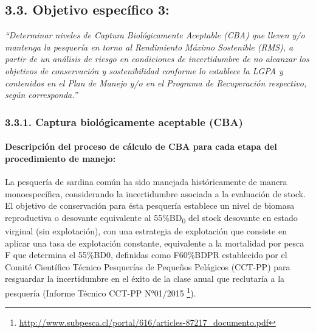 \documentclass[
  spanish,
]{article}
\begin{document}
\hypertarget{objetivo-especuxedfico-3}{%
\subsection{3.3. Objetivo específico
3:}\label{objetivo-especuxedfico-3}}

\vspace{-0.2cm}

\emph{``Determinar niveles de Captura Biológicamente Aceptable (CBA) que
lleven y/o mantenga la pesquería en torno al Rendimiento Máximo
Sostenible (RMS), a partir de un análisis de riesgo en condiciones de
incertidumbre de no alcanzar los objetivos de conservación y
sostenibilidad conforme lo establece la LGPA y contenidos en el Plan de
Manejo y/o en el Programa de Recuperación respectivo, según
corresponda.''}

\hypertarget{captura-bioluxf3gicamente-aceptable-cba-1}{%
\subsubsection{3.3.1. Captura biológicamente aceptable
(CBA)}\label{captura-bioluxf3gicamente-aceptable-cba-1}}

\hypertarget{descripciuxf3n-del-proceso-de-cuxe1lculo-de-cba-para-cada-etapa-del-procedimiento-de-manejo}{%
\paragraph{Descripción del proceso de cálculo de CBA para cada etapa del
procedimiento de
manejo:}\label{descripciuxf3n-del-proceso-de-cuxe1lculo-de-cba-para-cada-etapa-del-procedimiento-de-manejo}}

La pesquería de sardina común ha sido manejada históricamente de manera
monoespecífica, considerando la incertidumbre asociada a la evaluación
de stock. El objetivo de conservación para ésta pesquería establece un
nivel de biomasa reproductiva o desovante equivalente al
55\%BD\textsubscript{0} del stock desovante en estado virginal (sin
explotación), con una estrategia de explotación que consiste en aplicar
una tasa de explotación constante, equivalente a la mortalidad por pesca
F que determina el 55\%BD0, definidas como F60\%BDPR establecido por el
Comité Científico Técnico Pesquerías de Pequeños Pelágicos (CCT-PP) para
resguardar la incertidumbre en el éxito de la clase anual que reclutaría
a la pesquería (Informe Técnico CCT-PP N°01/2015 \footnote{\url{http://www.subpesca.cl/portal/616/articles-87217_documento.pdf}}).
\end{document}
